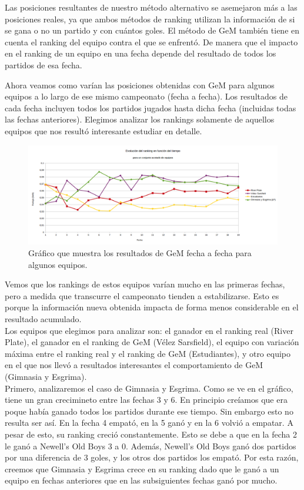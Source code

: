 Las posiciones resultantes de nuestro método alternativo se asemejaron más a las posiciones reales, ya que ambos métodos de ranking utilizan la información de si se gana o no un partido y con cuántos goles. El método de GeM también tiene en cuenta el ranking del equipo contra el que se enfrentó. De manera que el impacto en el ranking de un equipo en una fecha depende del resultado de todos los partidos de esa fecha.


Ahora veamos como varían las posiciones obtenidas con GeM para algunos equipos a lo largo de ese mismo campeonato (fecha a fecha). Los resultados de cada fecha incluyen todos los partidos jugados hasta dicha fecha (incluidas todas las fechas anteriores).
Elegimos analizar los rankings solamente de aquellos equipos que nos resultó interesante estudiar en detalle.

\begin{figure}[H]
  \includegraphics[scale=0.449]{imagenes/gemfechas2.png}
   \caption{Gráfico que muestra los resultados de GeM fecha a fecha para algunos equipos.}
  \label{fig:img1}
\end{figure}

Vemos que los rankings de estos equipos varían mucho en las primeras fechas, pero a medida que transcurre el campeonato tienden a estabilizarse. Esto es porque la información nueva obtenida impacta de forma menos considerable en el resultado acumulado.\\

Los equipos que elegimos para analizar son: el ganador en el ranking real (River Plate), el ganador en el ranking de GeM (Vélez Sarsfield), el equipo con variación máxima entre el ranking real y el ranking de GeM (Estudiantes), y otro equipo en el que nos llevó a resultados interesantes el comportamiento de GeM (Gimnasia y Esgrima).\\

Primero, analizaremos el caso de Gimnasia y Esgrima. Como se ve en el gráfico, tiene un gran crecimineto entre las fechas 3 y 6. En principio creíamos que era poque había ganado todos los partidos durante ese tiempo. Sin embargo esto no resulta ser así. En la fecha 4 empató, en la 5 ganó y en la 6 volvió a empatar. A pesar de esto, su ranking creció constantemente. Esto se debe a que en la fecha 2 le ganó a Newell's Old Boys 3 a 0. Además, Newell's Old Boys ganó dos partidos por una diferencia de 3 goles, y los otros dos partidos los empató. Por esta razón, creemos que Gimnasia y Esgrima crece en su ranking dado que le ganó a un equipo en fechas anteriores que en las subsiguientes fechas ganó por mucho. \\

